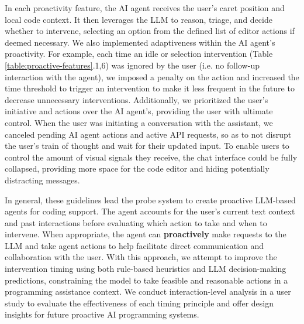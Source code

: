 In each proactivity feature, the AI agent receives the user's caret position and local code context.
It then leverages the LLM to reason, triage, and decide whether to intervene, selecting an option from the defined list of editor actions if deemed necessary.
We also implemented adaptiveness within the AI agent's proactivity. 
For example, each time an idle or selection intervention (Table \ref{table:proactive-features}.1,6) was ignored by the user (i.e. no follow-up interaction with the agent), we imposed a penalty on the action and increased the time threshold to trigger an intervention to make it less frequent in the future to decrease unnecessary interventions.
Additionally, we prioritized the user's initiative and actions over the AI agent's, providing the user with ultimate control. When the user was initiating a conversation with the assistant, we canceled pending AI agent actions and active API requests, so as to not disrupt the user’s train of thought and wait for their updated input. 
To enable users to control the amount of visual signals they receive, the chat interface could be fully collapsed, providing more space for the code editor and hiding potentially distracting messages. 

In general, these guidelines lead the probe system to create proactive LLM-based agents for coding support. The agent accounts for the user's current text context and past interactions before evaluating which action to take and when to intervene. When appropriate, the agent can \textbf{proactively} make requests to the LLM and take agent actions to help facilitate direct communication and collaboration with the user.
With this approach, we attempt to improve the intervention timing using both rule-based heuristics and LLM decision-making predictions, constraining the model to take feasible and reasonable actions in a programming assistance context.
We conduct interaction-level analysis in a user study to evaluate the effectiveness of each timing principle and offer design insights for future proactive AI programming systems.


